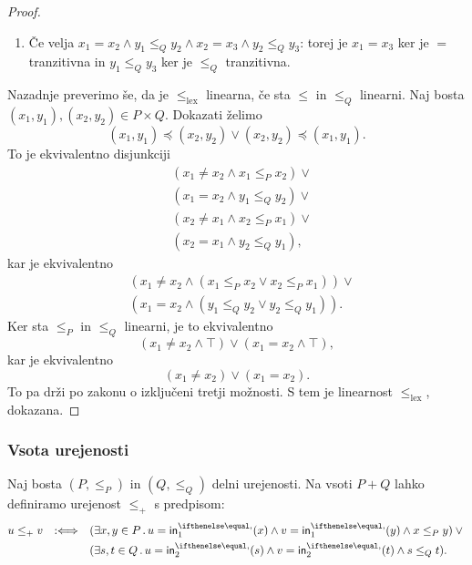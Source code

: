 \begin{proof}
\begin{enumerate}
  \item Če velja $x_1 = x_2 \land y_1 \leq_Q y_2 \land x_2 = x_3 \land y_2 \leq_Q y_3$: torej je $x_1 = x_3$ ker je $=$ tranzitivna in $y_1 \leq_Q y_3$ ker je $\leq_Q$ tranzitivna.
  \end{enumerate}
  Nazadnje preverimo še, da je $\leq_\mathrm{lex}$ linearna, če sta $\leq$ in $\leq_Q$ linearni. Naj bosta $(x_1,y_1), (x_2,y_2) \in P \times Q$. Dokazati želimo
  \begin{equation*}
    (x_1, y_1) \preceq (x_2, y_2) \lor (x_2, y_2) \preceq (x_1, y_1).
  \end{equation*}
  To je ekvivalentno disjunkciji
  \begin{align*}
    & (x_1 \neq x_2 \land x_1 \leq_P x_2) \lor {} \\
    & (x_1 = x_2 \land y_1 \leq_Q y_2) \lor {} \\
    & (x_2 \neq x_1 \land x_2 \leq_P x_1) \lor {} \\
    & (x_2 = x_1 \land y_2 \leq_Q y_1),
  \end{align*}
  kar je ekvivalentno
  \begin{align*}
    & (x_1 \neq x_2 \land (x_1 \leq_P x_2 \lor x_2 \leq_P x_1)) \lor {} \\
    &(x_1 = x_2 \land (y_1 \leq_Q y_2 \lor y_2 \leq_Q y_1)).
  \end{align*}
  Ker sta $\leq_P$ in $\leq_Q$ linearni, je to ekvivalentno
  \begin{equation*}
    (x_1 \neq x_2 \land \top) \lor (x_1 = x_2 \land \top),
  \end{equation*}
  kar je ekvivalentno
  \begin{equation*}
    (x_1 \neq x_2) \lor (x_1 = x_2).
  \end{equation*}
  To pa drži po zakonu o izključeni tretji možnosti. S tem je linearnost $\leq_\mathrm{lex}$, dokazana.
\end{proof}

\subsubsection{Vsota urejenosti}

Naj bosta $(P, \leq_P)$ in $(Q, \leq_Q)$ delni urejenosti. Na vsoti $P + Q$ lahko
definiramo urejenost $\leq_{+}$ s predpisom:
%
\begin{equation*}
  u \leq_{+} v \defiff
  \begin{aligned}[t]
    & (\some{x, y \in P} u = \inl(x) \land v = \inl(y) \land x \leq_P y) \lor {} \\
    & (\some{s, t \in Q} u = \inr(s) \land v = \inr(t) \land s \leq_Q t).
  \end{aligned}
\end{equation*}

